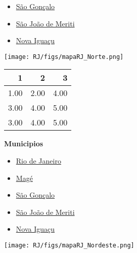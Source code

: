 \documentclass[10pt]{article} %
\begin{document}
\begin{minipage}[t]{.30\linewidth}
\begin{mdframed}[style=sidebar,frametitle={}]
\begin{itemize}
\item \hyperlink{SGoncalo}{São Gonçalo}
\item \hyperlink{SJMeriti}{São João de Meriti}
\item \hyperlink{Niguacu}{Nova Iguaçu}
\end{itemize}\end{mdframed}\hfill\end{minipage}\newpage\begin{minipage}[t]{.66\linewidth}
\hypertarget{Norte}{}
\texttt{[image: RJ/figs/mapaRJ\_Norte.png]}\vspace{0.5cm}\begin{center}
\begin{tabular}{rrr}
  \hline
1 & 2 & 3 \\ 
  \hline
1.00 & 2.00 & 4.00 \\ 
  3.00 & 4.00 & 5.00 \\ 
  3.00 & 4.00 & 5.00 \\ 
   \hline
\end{tabular}
\end{center}
\end{minipage}\hfill\begin{minipage}[t]{.30\linewidth}
\begin{mdframed}[style=sidebar,frametitle={}]
\textbf{Municipios}\begin{itemize}\item \hyperlink{Rio}{Rio de Janeiro}
\item \hyperlink{Mag}{Magé}
\item \hyperlink{SGoncalo}{São Gonçalo}
\item \hyperlink{SJMeriti}{São João de Meriti}
\item \hyperlink{Niguacu}{Nova Iguaçu}
\end{itemize}\end{mdframed}\hfill\end{minipage}\newpage\begin{minipage}[t]{.66\linewidth}
\hypertarget{Nord}{}
\texttt{[image: RJ/figs/mapaRJ\_Nordeste.png]}\vspace{0.5cm}\begin{center}

\end{center}
\end{minipage}
\end{document}
